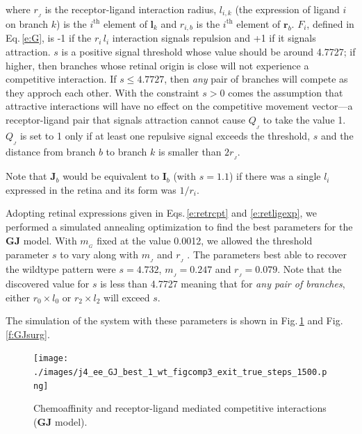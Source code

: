 \documentclass[11pt, a4paper, draft]{article}
\begin{document}
where $r_{\!_J}$ is the receptor-ligand interaction radius, $l_{i,k}$ (the
expression of ligand $i$ on branch $k$) is the $i^{\mathrm{th}}$ element of
$\mathbf{l}_k$ and $r_{i,b}$ is the $i^{\mathrm{th}}$ element of
$\mathbf{r}_b$. $F_i$, defined in Eq.\,\ref{e:G}, is -1 if the $r_{i}\,l_{i}$
interaction signals repulsion and +1 if it signals attraction. $s$ is a
positive signal threshold whose value should be around 4.7727; if higher, then
branches whose retinal origin is close will not experience a competitive
interaction. If $s\leq 4.7727$, then \emph{any} pair of branches will compete as they
approch each other. With the constraint $s>0$ comes the assumption that
attractive interactions will have no effect on the competitive movement
vector---a receptor-ligand pair that signals attraction cannot cause
$Q_{\!_J}$ to take the value 1. $Q_{\!_J}$ is set to 1 only if at least one
repulsive signal exceeds the threshold, $s$ and the distance from branch
$b$ to branch $k$ is smaller than $2 r_{\!_J}$.

Note that $\mathbf{J}_b$ would be equivalent to $\mathbf{I}_b$ (with $s=1.1$) if there
was a single $l_i$ expressed in the retina and its form was $1/r_i$.

Adopting retinal expressions given in Eqs.\,\ref{e:retrcpt}
and \ref{e:retligexp}, we performed a simulated annealing optimization to find
the best parameters for the $\mathbf{GJ}$ model.  With $m_{\!_G}$ fixed at the
value 0.0012, we allowed the threshold parameter $s$ to vary along with
$m_{\!_J}$ and $r_{\!_J}$ . The parameters best able to recover the wildtype
pattern were $s=4.732$, $m_{\!_J} = 0.247$ and $r_{\!_J} = 0.079$. Note that
the discovered value for $s$ is less than 4.7727 meaning that for \emph{any
pair of branches}, either $r_0\times l_0$ or $r_2\times l_2$ will exceed $s$.


The
simulation of the system with these parameters is shown in Fig.\,\ref{f:GJ}
and Fig.\,\ref{f:GJsurg}.

\begin{figure}
\texttt{[image: ./images/j4\_ee\_GJ\_best\_1\_wt\_figcomp3\_exit\_true\_steps\_1500.png]}
\caption{Chemoaffinity and receptor-ligand mediated competitive interactions
($\mathbf{GJ}$ model). }
\label{f:GJ}
\end{figure}
\end{document}

